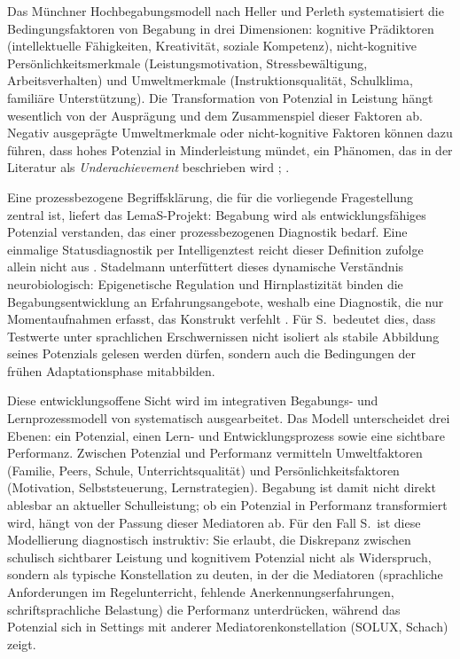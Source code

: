 \documentclass[ngerman, a4paper]{article}
\begin{document}
Das Münchner Hochbegabungsmodell nach Heller und Perleth systematisiert die
Bedingungsfaktoren von Begabung in drei Dimensionen: kognitive Prädiktoren
(intellektuelle Fähigkeiten, Kreativität, soziale Kompetenz), nicht-kognitive
Persönlichkeitsmerkmale (Leistungsmotivation, Stressbewältigung, Arbeitsverhalten) und
Umweltmerkmale (Instruktionsqualität, Schulklima, familiäre Unterstützung). Die
Transformation von Potenzial in Leistung hängt wesentlich von der Ausprägung und dem
Zusammenspiel dieser Faktoren ab. Negativ ausgeprägte Umweltmerkmale oder
nicht-kognitive Faktoren können dazu führen, dass hohes Potenzial in
Minderleistung mündet, ein Phänomen, das in der Literatur als
\textit{Underachievement} beschrieben wird
\parencite[Kap.\,2.2]{preckel2013hochbegabung};
\parencite[S.\,242--253]{fischer2020begabungsfoerderung}.

Eine prozessbezogene Begriffsklärung, die für die vorliegende Fragestellung
zentral ist, liefert das LemaS-Projekt: Begabung wird als entwicklungsfähiges
Potenzial verstanden, das einer prozessbezogenen Diagnostik bedarf. Eine
einmalige Statusdiagnostik per Intelligenztest reicht dieser Definition
zufolge allein nicht aus \parencite{lemas2023begriffsklaerung}. Stadelmann
unterfüttert dieses dynamische Verständnis neurobiologisch: Epigenetische
Regulation und Hirnplastizität binden die Begabungsentwicklung an
Erfahrungsangebote, weshalb eine Diagnostik, die nur Momentaufnahmen
erfasst, das Konstrukt verfehlt
\parencite[S.\,133--147]{stadelmann2021begabungsentwicklung}. 
Für S.\ bedeutet dies, dass
Testwerte unter sprachlichen Erschwernissen nicht isoliert als stabile
Abbildung seines Potenzials gelesen werden dürfen, sondern auch die
Bedingungen der frühen Adaptationsphase mitabbilden.

Diese entwicklungsoffene Sicht wird im integrativen Begabungs- und
Lernprozessmodell von \textcite[S.\,393--395]{fischerfischerontrup2014integratives}
systematisch ausgearbeitet. Das Modell unterscheidet drei Ebenen: ein Potenzial,
einen Lern- und Entwicklungsprozess sowie eine sichtbare Performanz. Zwischen
Potenzial und Performanz vermitteln Umweltfaktoren (Familie, Peers, Schule,
Unterrichtsqualität) und Persönlichkeitsfaktoren (Motivation, Selbststeuerung,
Lernstrategien). Begabung ist damit nicht direkt ablesbar an aktueller
Schulleistung; ob ein Potenzial in Performanz transformiert wird, hängt von der
Passung dieser Mediatoren ab. Für den Fall S.\ ist diese Modellierung diagnostisch
instruktiv: Sie erlaubt, die Diskrepanz zwischen schulisch sichtbarer Leistung und
kognitivem Potenzial nicht als Widerspruch, sondern als typische Konstellation zu
deuten, in der die Mediatoren (sprachliche Anforderungen im Regelunterricht,
fehlende Anerkennungserfahrungen, schriftsprachliche Belastung) die Performanz
unterdrücken, während das Potenzial sich in Settings mit anderer
Mediatorenkonstellation (SOLUX, Schach) zeigt.
\end{document}
